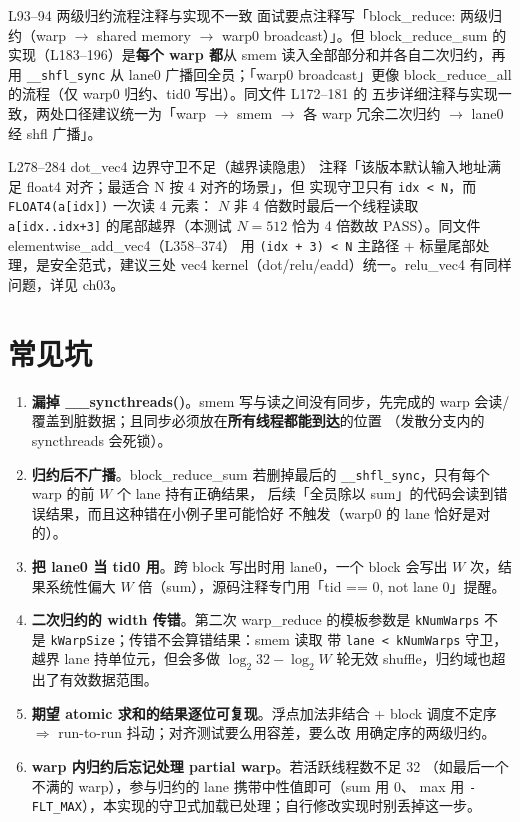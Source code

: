 \begin{kaogu}[F1]{L93--94 两级归约流程注释与实现不一致}
面试要点注释写「block\_reduce: 两级归约（warp $\to$ shared memory $\to$
warp0 broadcast）」。但 block\_reduce\_sum 的实现（L183--196）是\textbf{每个
warp 都}从 smem 读入全部部分和并各自二次归约，再用
\texttt{\_\_shfl\_sync} 从 lane0 广播回全员；「warp0 broadcast」更像
block\_reduce\_all 的流程（仅 warp0 归约、tid0 写出）。同文件 L172--181 的
五步详细注释与实现一致，两处口径建议统一为「warp $\to$ smem $\to$ 各 warp
冗余二次归约 $\to$ lane0 经 shfl 广播」。
\end{kaogu}

\begin{kaogu}[F1]{L278--284 dot\_vec4 边界守卫不足（越界读隐患）}
注释「该版本默认输入地址满足 float4 对齐；最适合 N 按 4 对齐的场景」，但
实现守卫只有 \texttt{idx < N}，而 \texttt{FLOAT4\allowbreak{}(a[idx])} 一次读 4 元素：
$N$ 非 4 倍数时最后一个线程读取 \texttt{a[idx.\allowbreak{}.\allowbreak{}idx+3]} 的尾部越界（本测试
$N = 512$ 恰为 4 倍数故 PASS）。同文件 elementwise\_add\_vec4（L358--374）
用 \texttt{(idx + 3) < N} 主路径 + 标量尾部处理，是安全范式，建议三处
vec4 kernel（dot/relu/eadd）统一。relu\_vec4 有同样问题，详见 ch03。
\end{kaogu}

\section{常见坑}

\begin{enumerate}
\item \textbf{漏掉 \_\_syncthreads()}。smem 写与读之间没有同步，先完成的
  warp 会读/覆盖到脏数据；且同步必须放在\textbf{所有线程都能到达}的位置
  （发散分支内的 syncthreads 会死锁）。
\item \textbf{归约后不广播}。block\_reduce\_sum 若删掉最后的
  \texttt{\_\_shfl\_sync}，只有每个 warp 的前 $W$ 个 lane 持有正确结果，
  后续「全员除以 sum」的代码会读到错误结果，而且这种错在小例子里可能恰好
  不触发（warp0 的 lane 恰好是对的）。
\item \textbf{把 lane0 当 tid0 用}。跨 block 写出时用 lane0，一个 block
  会写出 $W$ 次，结果系统性偏大 $W$ 倍（sum），源码注释专门用「tid == 0,
  not lane 0」提醒。
\item \textbf{二次归约的 width 传错}。第二次 warp\_reduce 的模板参数是
  \texttt{kNumWarps} 不是 \texttt{kWarpSize}；传错不会算错结果：smem 读取
  带 \texttt{lane < kNumWarps} 守卫，越界 lane 持单位元，但会多做
  $\log_2 32 - \log_2 W$ 轮无效 shuffle，归约域也超出了有效数据范围。
\item \textbf{期望 atomic 求和的结果逐位可复现}。浮点加法非结合 + block
  调度不定序 $\Rightarrow$ run-to-run 抖动；对齐测试要么用容差，要么改
  用确定序的两级归约。
\item \textbf{warp 内归约后忘记处理 partial warp}。若活跃线程数不足 32
  （如最后一个不满的 warp），参与归约的 lane 携带中性值即可（sum 用 0、
  max 用 \texttt{-FLT\_MAX}），本实现的守卫式加载已处理；自行修改实现时别丢掉这一步。
\end{enumerate}

